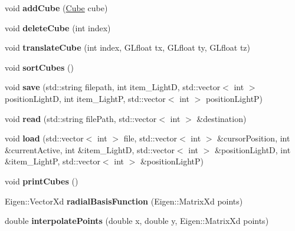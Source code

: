 \begin{DoxyCompactItemize}
\item 
\mbox{\label{classglimac_1_1CubeList_adaa2b032e1ee67cd7dc9feaab94edc6d}} 
void {\bfseries add\+Cube} (\hyperlink{classglimac_1_1Cube}{Cube} cube)
\item 
\mbox{\label{classglimac_1_1CubeList_ac8ffe918d3ff2788edd5c5bbfba45135}} 
void {\bfseries delete\+Cube} (int index)
\item 
\mbox{\label{classglimac_1_1CubeList_ace7f18a7aab16f50e724eab7d66d27b2}} 
void {\bfseries translate\+Cube} (int index, G\+Lfloat tx, G\+Lfloat ty, G\+Lfloat tz)
\item 
\mbox{\label{classglimac_1_1CubeList_af6615c0db1a97fcae5df6f27de71b6d8}} 
void {\bfseries sort\+Cubes} ()
\item 
\mbox{\label{classglimac_1_1CubeList_a9e7ac57439f018d89b71c6071efd48e6}} 
void {\bfseries save} (std\+::string filepath, int item\+\_\+\+LightD, std\+::vector$<$ int $>$ position\+LightD, int item\+\_\+\+LightP, std\+::vector$<$ int $>$ position\+LightP)
\item 
\mbox{\label{classglimac_1_1CubeList_a59d87cac2e218d617940ccdab5235b31}} 
void {\bfseries read} (std\+::string file\+Path, std\+::vector$<$ int $>$ \&destination)
\item 
\mbox{\label{classglimac_1_1CubeList_a6f615ea1238b29f8e19859b528ac6f26}} 
void {\bfseries load} (std\+::vector$<$ int $>$ file, std\+::vector$<$ int $>$ \&cursor\+Position, int \&current\+Active, int \&item\+\_\+\+LightD, std\+::vector$<$ int $>$ \&position\+LightD, int \&item\+\_\+\+LightP, std\+::vector$<$ int $>$ \&position\+LightP)
\item 
\mbox{\label{classglimac_1_1CubeList_a5c3e997708642903eb6b4c806de0cdf9}} 
void {\bfseries print\+Cubes} ()
\item 
\mbox{\label{classglimac_1_1CubeList_ae267d305c2b80db2912abf8737baf537}} 
Eigen\+::\+Vector\+Xd {\bfseries radial\+Basis\+Function} (Eigen\+::\+Matrix\+Xd points)
\item 
\mbox{\label{classglimac_1_1CubeList_a811e3f908710eb469fc681ec1a5f29c7}} 
double {\bfseries interpolate\+Points} (double x, double y, Eigen\+::\+Matrix\+Xd points)
\end{DoxyCompactItemize}
